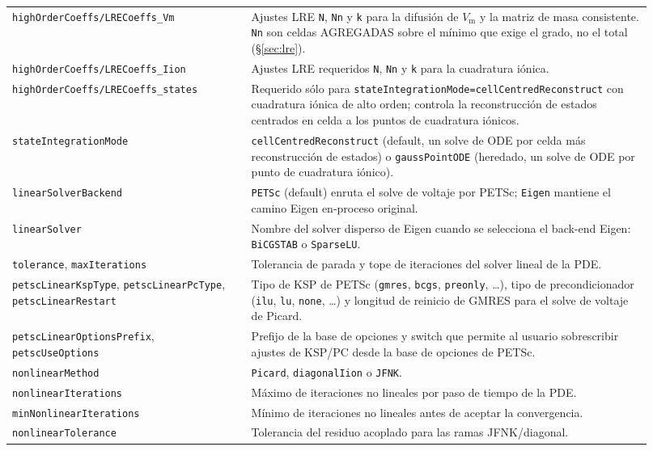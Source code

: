 \documentclass[11pt,a4paper]{article}
\newcommand{\code}[1]{\texttt{\small #1}}
\newcommand{\Vm}{V_{\text{m}}}
\begin{document}
\begin{longtable}{@{}p{0.34\linewidth}p{0.58\linewidth}@{}}
\code{highOrderCoeffs/LRECoeffs\_Vm} & Ajustes LRE \code{N}, \code{Nn} y \code{k} para la difusión de $\Vm$ y la matriz de masa consistente. \code{Nn} son celdas AGREGADAS sobre el mínimo que exige el grado, no el total (\S\ref{sec:lre}). \\
\code{highOrderCoeffs/LRECoeffs\_Iion} & Ajustes LRE requeridos \code{N}, \code{Nn} y \code{k} para la cuadratura iónica. \\
\code{highOrderCoeffs/LRECoeffs\_states} & Requerido sólo para \code{stateIntegrationMode=cellCentredReconstruct} con cuadratura iónica de alto orden; controla la reconstrucción de estados centrados en celda a los puntos de cuadratura iónicos. \\
\code{stateIntegrationMode} & \code{cellCentredReconstruct} (default, un solve de ODE por celda más reconstrucción de estados) o \code{gaussPointODE} (heredado, un solve de ODE por punto de cuadratura iónico). \\
\code{linearSolverBackend} & \code{PETSc} (default) enruta el solve de voltaje por PETSc; \code{Eigen} mantiene el camino Eigen en-proceso original. \\
\code{linearSolver} & Nombre del solver disperso de Eigen cuando se selecciona el back-end Eigen: \code{BiCGSTAB} o \code{SparseLU}. \\
\code{tolerance}, \code{maxIterations} & Tolerancia de parada y tope de iteraciones del solver lineal de la PDE. \\
\code{petscLinearKspType}, \code{petscLinearPcType}, \code{petscLinearRestart} & Tipo de KSP de PETSc (\code{gmres}, \code{bcgs}, \code{preonly}, \ldots), tipo de precondicionador (\code{ilu}, \code{lu}, \code{none}, \ldots) y longitud de reinicio de GMRES para el solve de voltaje de Picard. \\
\code{petscLinearOptionsPrefix}, \code{petscUseOptions} & Prefijo de la base de opciones y switch que permite al usuario sobrescribir ajustes de KSP/PC desde la base de opciones de PETSc. \\
\code{nonlinearMethod} & \code{Picard}, \code{diagonalIion} o \code{JFNK}. \\
\code{nonlinearIterations} & Máximo de iteraciones no lineales por paso de tiempo de la PDE. \\
\code{minNonlinearIterations} & Mínimo de iteraciones no lineales antes de aceptar la convergencia. \\
\code{nonlinearTolerance} & Tolerancia del residuo acoplado para las ramas JFNK/diagonal. \\

\end{longtable}
\end{document}
